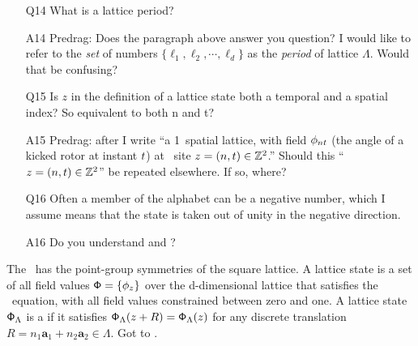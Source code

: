 \begin{description}
\begin{itemize}
	\item[Q14]
What is a lattice period?
	\item[A14]
Predrag: Does the paragraph above  answer you question?
I would like to refer to the \emph{set} of numbers
$\{\ell_1,\ell_2,\cdots,\ell_d\}$ as the \emph{period} of lattice
$\Lambda$. Would that be confusing?
	\item[Q15]
Is $z$ in the definition of a lattice state both a temporal and a spatial index? So equivalent to both n and t?
	\item[A15]
Predrag: after  I write ``a 1\dmn\ spatial
lattice, with field $\phi_{nt}$ (the angle of a kicked rotor
 at instant $t$) at \spt\ site
$z=(n,t)\in\mathbb{Z}^2$.'' Should this
``$z=(n,t)\in\mathbb{Z}^2$'' be repeated elsewhere. If so, where?
	\item[Q16]
Often a member of the alphabet can be a negative number, which I assume
means that the state is taken out of unity in the negative direction.
	\item[A16]
Do you understand  and ?
\end{itemize}

The
\catlatt\ has the point-group symmetries of the square lattice.
A lattice state is a set of all field values $\mathsf{\Phi}=\{\phi_z\}$ over the
d-dimensional lattice that satisfies the \catlatt\ equation,
with all field values constrained between zero and one. A lattice state
$\mathsf{\Phi}_{\Lambda}$ is a \emph{\twot} if it satisfies
$\mathsf{\Phi}_{\Lambda}(z+R)=\mathsf{\Phi}_{\Lambda}(z)$ for any
discrete translation $R=n_1\mathbf{a}_1+n_2\mathbf{a}_2 \in \Lambda$. Got
to .


\end{description}
